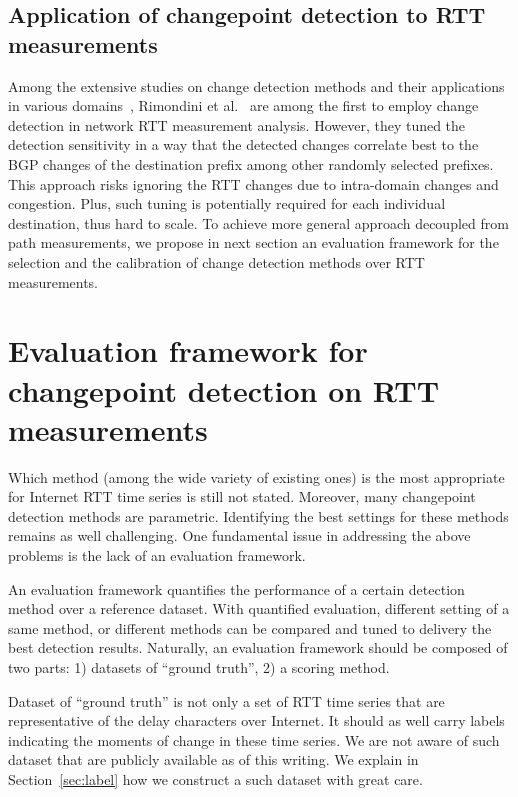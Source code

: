\subsection{Application of changepoint detection to RTT measurements}
Among the extensive studies on change detection methods and their applications in various domains~\cite{Zhang2007,Reeves2007, Yu2008},
Rimondini et al.~\cite{Rimondini2014} are among the first to employ change detection in network RTT measurement analysis.
However, they tuned the detection sensitivity in a way that the detected changes correlate best to the BGP changes of the destination prefix among other randomly selected prefixes.
This approach risks ignoring the RTT changes due to intra-domain changes and congestion.
Plus, such tuning is potentially required for each individual destination, thus hard to scale.
To achieve more general approach decoupled from path measurements, we propose in next section an evaluation framework for the selection and the calibration of change detection methods over RTT measurements.


\section{Evaluation framework for changepoint detection on RTT measurements}
\label{sec:eval_frame}
Which method (among the wide variety of existing ones) is the most appropriate for Internet RTT time series is still not stated. 
Moreover, many changepoint detection methods are parametric. 
Identifying the best settings for these methods remains as well challenging.
One fundamental issue in addressing the above problems is the lack of an evaluation framework.

An evaluation framework quantifies the performance of a certain detection method over a reference dataset.
With quantified evaluation, different setting of a same method, or different methods can be compared and tuned to delivery the best detection results.
Naturally, an evaluation framework should be composed of two parts: 1) datasets of ``ground truth'', 2) a scoring method.

Dataset of ``ground truth'' is not only a set of RTT time series that are representative of the delay characters over Internet.
It should as well carry labels indicating the moments of change in these time series.
We are not aware of such dataset that are publicly available as of this writing.
We explain in Section~\ref{sec:label} how we construct a such dataset with great care.

